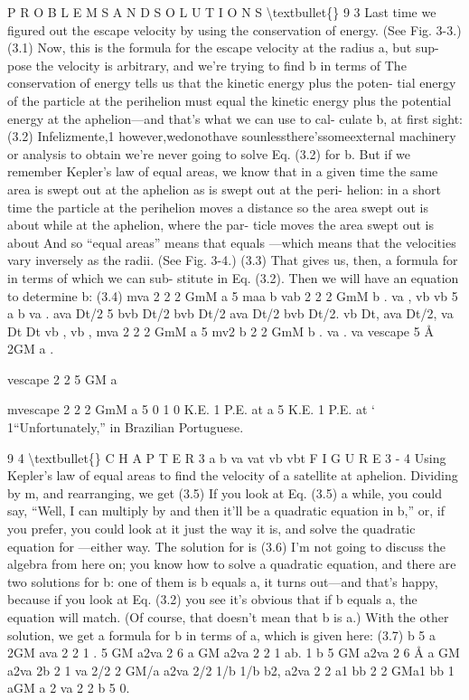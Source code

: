 \documentclass[10pt,oneside]{article}
\begin{document}
P R O B L E M S  A N D  S O L U T I O N S \textbackslash{}textbullet\{\} 9 3 Last time we figured out the escape velocity by using the conservation of energy. (See Fig. 3-3.) (3.1) Now, this is the formula for the escape velocity at the radius a, but sup- pose the velocity is arbitrary, and we’re trying to find b in terms of The conservation of energy tells us that the kinetic energy plus the poten- tial energy of the particle at the perihelion must equal the kinetic energy plus the potential energy at the aphelion---and that’s what we can use to cal- culate b, at first sight: (3.2) Infelizmente,1 however,wedonothave sounlessthere’ssomeexternal machinery or analysis to obtain we’re never going to solve Eq. (3.2) for b. But if we remember Kepler’s law of equal areas, we know that in a given time the same area is swept out at the aphelion as is swept out at the peri- helion: in a short time the particle at the perihelion moves a distance so the area swept out is about while at the aphelion, where the par- ticle moves the area swept out is about And so “equal areas” means that equals ---which means that the velocities vary inversely as the radii. (See Fig. 3-4.) (3.3) That gives us, then, a formula for in terms of which we can sub- stitute in Eq. (3.2). Then we will have an equation to determine b: (3.4) mva 2 2 2 GmM a 5 maa b vab 2 2 2 GmM b . va , vb vb 5 a b va . ava Dt/2 5 bvb Dt/2 bvb Dt/2 ava Dt/2 bvb Dt/2. vb Dt, ava Dt/2, va Dt Dt vb , vb , mva 2 2 2 GmM a 5 mv2 b 2 2 GmM b . va . va vescape 5 Å 2GM a .\par

vescape 2 2 5 GM a\par

mvescape 2 2 2 GmM a 5 0 1 0 K.E. 1 P.E. at a 5 K.E. 1 P.E. at ` 1“Unfortunately,” in Brazilian Portuguese.\par

9 4 \textbackslash{}textbullet\{\} C H A P T E R  3 a b va vat vb vbt F I G U R E  3 - 4 Using Kepler’s law of equal areas to find the velocity of a satellite at aphelion. Dividing by m, and rearranging, we get (3.5) If you look at Eq. (3.5) a while, you could say, “Well, I can multiply by and then it’ll be a quadratic equation in b,” or, if you prefer, you could look at it just the way it is, and solve the quadratic equation for ---either way. The solution for is (3.6) I’m not going to discuss the algebra from here on; you know how to solve a quadratic equation, and there are two solutions for b: one of them is b equals a, it turns out---and that’s happy, because if you look at Eq. (3.2) you see it’s obvious that if b equals a, the equation will match. (Of course, that doesn’t mean that b is a.) With the other solution, we get a formula for b in terms of a, which is given here: (3.7) b 5 a 2GM ava 2 2 1 . 5 GM a2va 2 6 a GM a2va 2 2 1 ab. 1 b 5 GM a2va 2 6 Å a GM a2va 2b 2 1 va 2/2 2 GM/a a2va 2/2 1/b 1/b b2, a2va 2 2 a1 bb 2 2 GMa1 bb 1 aGM a 2 va 2 2 b 5 0.\par
\end{document}
